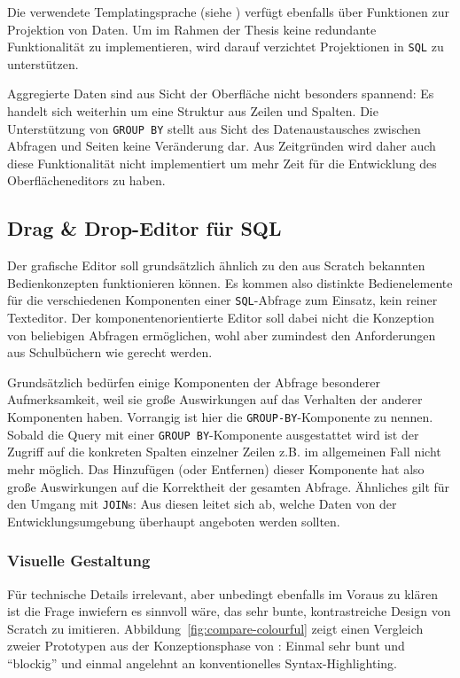 Die verwendete Templatingsprache (siehe ) verfügt ebenfalls über Funktionen zur Projektion von Daten. Um im Rahmen der Thesis keine redundante Funktionalität zu implementieren, wird darauf verzichtet Projektionen in \texttt{SQL} zu unterstützen.

Aggregierte Daten sind aus Sicht der Oberfläche nicht besonders spannend: Es handelt sich weiterhin um eine Struktur aus Zeilen und Spalten. Die Unterstützung von \texttt{GROUP BY} stellt aus Sicht des Datenaustausches zwischen Abfragen und Seiten keine Veränderung dar. Aus Zeitgründen wird daher auch diese Funktionalität nicht implementiert um mehr Zeit für die Entwicklung des Oberflächeneditors zu haben.

\subsection{Drag \& Drop-Editor für SQL}
\label{sec:design-sql-editor}

Der grafische Editor soll grundsätzlich ähnlich zu den aus Scratch bekannten Bedienkonzepten funktionieren können. Es kommen also distinkte Bedienelemente für die verschiedenen Komponenten einer \texttt{SQL}-Abfrage zum Einsatz, kein reiner Texteditor. Der komponentenorientierte Editor soll dabei nicht die Konzeption von beliebigen Abfragen ermöglichen, wohl aber zumindest den Anforderungen aus Schulbüchern wie \cite{grimm_informatik_2015, hubwieser_inf_2} gerecht werden.

Grundsätzlich bedürfen einige Komponenten der Abfrage besonderer Aufmerksamkeit, weil sie große Auswirkungen auf das Verhalten der anderer Komponenten haben. Vorrangig ist hier die \texttt{GROUP-BY}-Komponente zu nennen. Sobald die Query mit einer \texttt{GROUP BY}-Komponente ausgestattet wird ist der Zugriff auf die konkreten Spalten einzelner Zeilen z.B. im allgemeinen Fall nicht mehr möglich. Das Hinzufügen (oder Entfernen) dieser Komponente hat also große Auswirkungen auf die Korrektheit der gesamten Abfrage. Ähnliches gilt für den Umgang mit \texttt{JOIN}s: Aus diesen leitet sich ab, welche Daten von der Entwicklungsumgebung überhaupt angeboten werden sollten.

\subsubsection{Visuelle Gestaltung}

Für technische Details irrelevant, aber unbedingt ebenfalls im Voraus zu klären ist die Frage inwiefern es sinnvoll wäre, das sehr bunte, kontrastreiche Design von Scratch zu imitieren. Abbildung~\ref{fig:compare-colourful} zeigt einen Vergleich zweier Prototypen aus der Konzeptionsphase von \idename{}: Einmal sehr bunt und "`blockig"' und einmal angelehnt an konventionelles Syntax-Highlighting.


